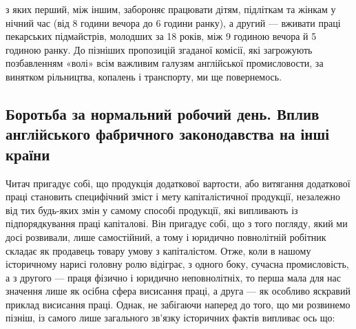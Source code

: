 з яких перший, між іншим, забороняє працювати дітям, підліткам
та жінкам у нічний час (від 8 години вечора до 6 години
ранку), а другий — вживати праці пекарських підмайстрів, молодших
за 18 років, між 9 годиною вечора й 5 годиною ранку.
До пізніших пропозицій згаданої комісії, які загрожують позбавленням
«волі» всім важливим галузям англійської промисловости,
за винятком рільництва, копалень і транспорту, ми ще
повернемось.
\subsection{Боротьба за нормальний робочий день. Вплив англійського
фабричного законодавства на інші країни}

Читач пригадує собі, що продукція додаткової вартости, або
витягання додаткової праці становить специфічний зміст і мету
капіталістичної продукції, незалежно від тих будь-яких змін
у самому способі продукції, які випливають із підпорядкування
праці капіталові. Він пригадує собі, що з того погляду, який
ми досі розвивали, лише самостійний, а тому і юридично повнолітній
робітник складає як продавець товару умову з капіталістом.
Отже, коли в нашому історичному нарисі головну ролю
відіграє, з одного боку, сучасна промисловість, а з другого —
праця фізично і юридично неповнолітніх, то перша мала для
нас значення лише як осібна сфера висисання праці, а друга —
як особливо яскравий приклад висисання праці. Однак, не забігаючи
наперед до того, що ми розвинемо пізніш, із самого лише
загального зв’язку історичних фактів випливає ось що:

